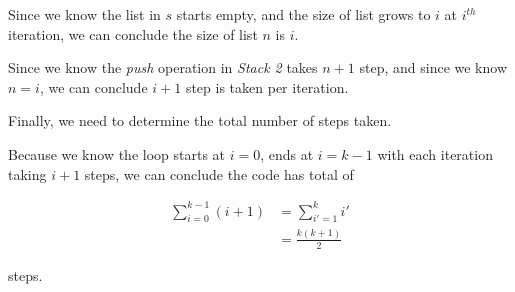 \documentclass[12pt]{article}
\begin{document}
\begin{enumerate}[a.]
\begin{mdframed}
        Since we know the list in $s$ starts empty, and the size of list grows to $i$ at $i^{th}$
        iteration, we can conclude the size of list $n$ is $i$.

        \bigskip

        Since we know the \textit{push} operation in \textit{Stack 2} takes $n+1$ step,
        and since we know $n = i$, we can conclude $i+1$ step is taken per iteration.

        \bigskip

        Finally, we need to determine the total number of steps taken.

        \bigskip

        Because we know the loop starts at $i = 0$, ends at $i = k-1$ with each iteration
        taking $i+1$ steps, we can conclude the code has total of

        \setcounter{equation}{0}
        \begin{align}
            \sum\limits_{i=0}^{k-1} (i+1) &= \sum\limits_{i'=1}^k i'\\
            &= \frac{k(k+1)}{2}
        \end{align}

        steps.

    \end{mdframed}


\end{enumerate}
\end{document}
